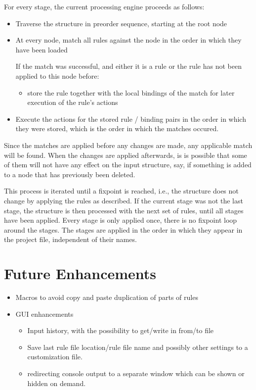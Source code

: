 \documentclass[11pt,a4paper]{article}
\begin{document}
For every stage, the current processing engine proceeds as follows:
\begin{itemize}
\item Traverse the structure in preorder sequence, starting at the root node
\item At every node, match all rules against the node in the order in which
  they have been loaded

  \noindent{}If the match was successful, and either it is a \tok{=>} rule or
  the rule has not been applied to this node before:\\[-3.4ex]
  \begin{itemize}
  \item[] store the rule together with the
    local bindings of the match for later execution of the rule's actions
  \end{itemize}
\item Execute the actions for the stored rule / binding pairs in the order in
  which they were stored, which is the order in which the matches occured.
\end{itemize}

Since the matches are applied before any changes are made, any applicable match
will be found. When the changes are applied afterwards, is is possible that
some of them will not have any effect on the input structure, say, if something
is added to a node that has previously been deleted.

This process is iterated until a fixpoint is reached, i.e., the structure does
not change by applying the rules as described. If the current stage was not the
last stage, the structure is then processed with the next set of rules, until
all stages have been applied. Every stage is only applied once, there is no
fixpoint loop around the stages. The stages are applied in the order in which
they appear in the project file, independent of their names.

\section{Future Enhancements}
\begin{itemize}
\item Macros to avoid copy and paste duplication of parts of rules
\item GUI enhancements
  \begin{itemize}
  \item Input history, with the possibility to get/write in from/to file
  \item Save last rule file location/rule file name and possibly other settings
    to a customization file.
  \item redirecting console output to a separate window which can be shown or
    hidden on demand.
  \end{itemize}
\end{itemize}
\fi
\end{document}
